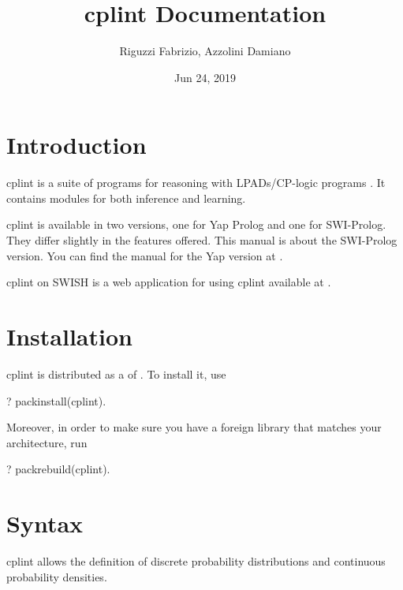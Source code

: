 \documentclass[letterpaper,10pt,english]{sphinxmanual}
\title{cplint Documentation}
\date{Jun 24, 2019}
\author{Riguzzi Fabrizio, Azzolini Damiano}
\begin{document}
\pagestyle{empty}
\sphinxmaketitle
\pagestyle{plain}
\sphinxtableofcontents
\pagestyle{normal}
\label{\detokenize{index::doc}}



\chapter{Introduction}
\label{\detokenize{index:introduction}}
cplint is a suite of programs for reasoning with LPADs/CP-logic programs .
It contains modules for both inference and learning.

cplint is available in two versions, one for Yap Prolog and one for SWI-Prolog.
They differ slightly in the features offered.
This manual is about the SWI-Prolog version.
You can find the manual for the Yap version at .

cplint on SWISH is a web application for using cplint available at .


\chapter{Installation}
\label{\detokenize{index:installation}}
cplint is distributed as a  of .
To install it, use

\begin{sphinxVerbatim}[commandchars=\\\{\}]
?\PYGZhy{} pack\PYGZus{}install(cplint).
\end{sphinxVerbatim}

Moreover, in order to make sure you have a foreign library that matches your architecture, run

\begin{sphinxVerbatim}[commandchars=\\\{\}]
?\PYGZhy{} pack\PYGZus{}rebuild(cplint).
\end{sphinxVerbatim}


\chapter{Syntax}
\label{\detokenize{index:syntax}}
cplint allows the definition of discrete probability distributions and continuous probability densities.
\end{document}
